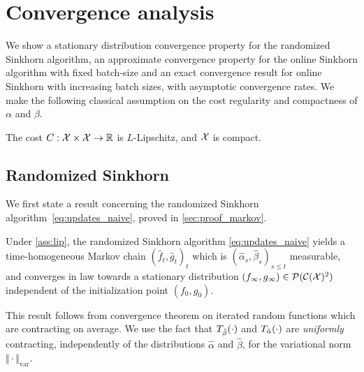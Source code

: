 

\section{Convergence analysis}\label{sec:analysis}

We show a
stationary distribution convergence property for the randomized Sinkhorn algorithm,
 an approximate convergence property for the online Sinkhorn algorithm with
fixed batch-size and an exact convergence result for online Sinkhorn with
increasing batch sizes, with asymptotic convergence rates. We make the following classical assumption on the cost regularity and compactness of $\alpha$ and $\beta$.

\begin{assumption}\label{ass:lip}
    The cost $C: \mathcal{X} \times \mathcal{X} \to \mathbb{R}$ is $L$-Lipschitz, and $\mathcal{X}$ is  compact.
\end{assumption}

\subsection{Randomized Sinkhorn}

We first state a result concerning the randomized Sinkhorn algorithm~\eqref{eq:updates_naive}, proved in \autoref{sec:proof_markov}.

\begin{proposition}\label{prop:markov}
    Under \autoref{ass:lip}, the randomized Sinkhorn algorithm \eqref{eq:updates_naive} yields a time-homogeneous
    Markov chain ${(\hat f_t, \hat g_t)}_t$ which is $(\hat \alpha_s, \hat \beta_s)_{s \leq
    t}$ measurable, and converges in law towards a stationary distribution
    $(f_\infty, g_\infty) \in \mathcal{P}(\mathcal{C}(\mathcal{X})^2)$ independent of the initialization
    point $(f_0, g_0)$.
\end{proposition}

This result follows from \citet{diaconis_iterated} convergence theorem on
iterated random functions which are contracting on average. We use the
fact that $T_{\hat \beta}(\cdot)$ and $T_{\hat \alpha}(\cdot)$ are
\textit{uniformly} contracting, independently of the distributions $\hat \alpha$ and
$\hat \beta$, for the variational norm $\Vert \cdot \Vert_{\text{var}}$. 

